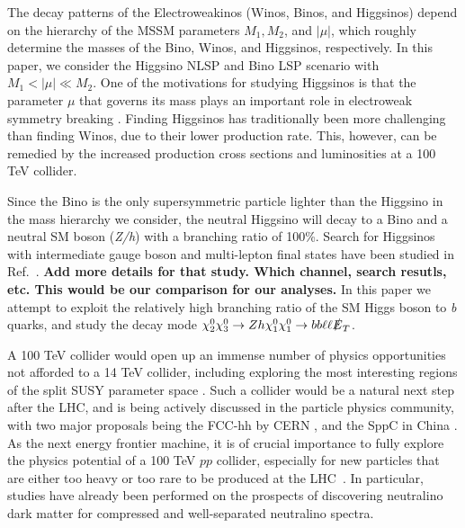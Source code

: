 \documentclass[a4paper,11pt]{article}
\newcommand{\Shufang}[1]{{\bf\color{Maroon}  #1}}
\newcommand{\met}{{\slashed{E}_T}}
\begin{document}
The decay patterns of the Electroweakinos (Winos, Binos, and Higgsinos)
depend on the hierarchy of the MSSM parameters $M_1, M_2$, and $|\mu|$, which 
roughly determine the masses of the Bino, Winos, and Higgsinos, respectively.
In this paper, we consider the Higgsino NLSP and Bino LSP scenario with $M_1 < |\mu| \ll M_2$.
One of the motivations for studying Higgsinos is that the parameter $\mu$ 
that governs its mass plays an important role in electroweak symmetry breaking 
\citep{Acharya:2014pua}. Finding Higgsinos has traditionally been more challenging 
than finding Winos, due to their lower production rate. This, however, can 
be remedied by the increased  production cross sections and luminosities 
at a 100 TeV collider.


 

Since the Bino is the only supersymmetric particle lighter than the Higgsino in the mass hierarchy we consider, the neutral Higgsino will decay to a Bino and a neutral SM boson (\emph{Z/h}) with a branching ratio of 100\%. 
Search for Higgsinos with intermediate gauge boson and  multi-lepton final states have been studied in Ref.~\cite{Gori:2014oua}. \Shufang{Add more details for that study.  Which channel, search resutls, etc.  This would be our comparison for our analyses.}  In this paper we attempt to exploit the relatively high branching ratio of 
the SM Higgs boson to \emph{b} quarks, and study the decay mode $\chi_2^0\chi_3^0\rightarrow Zh \chi_1^0\chi_1^0\rightarrow bb\ell\ell \met$.

A 100 TeV collider would open up an immense number of physics
opportunities not afforded to a 14 TeV collider, including exploring the
most interesting regions of the split SUSY parameter space
\citep{Arkani-Hamed:2015vfh}.
Such a collider would be a natural next step after the LHC, and is being
actively discussed in the particle physics community, with two major
proposals being the FCC-hh by CERN \citep{FCC-hh}, and the SppC  
in China \citep{CEPC}.  As the next energy frontier machine, it is of 
crucial importance to fully explore the physics potential of a 100 TeV $pp$
collider, especially for new particles that are either too heavy or too rare 
to be produced at the LHC~\citep{Arkani-Hamed:2015vfh,Contino:2016spe,Golling:2016gvc,Mangano:2016jyj}.
In particular, studies have already been performed on the prospects of
discovering neutralino dark matter for compressed \cite{Low:2014cba, diCortona:2014yua,Cirelli:2014dsa,Mahbubani:2018tin,Han:2018wus}
and well-separated \cite{Gori:2014oua,Acharya:2014pua}
neutralino spectra.
\end{document}
